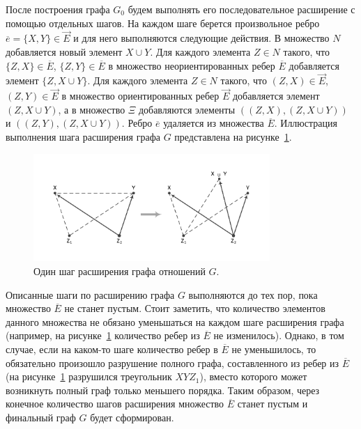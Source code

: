 \documentclass[
11pt,%
tightenlines,%
twoside,%
onecolumn,%
nofloats,%
nobibnotes,%
nofootinbib,%
superscriptaddress,%
noshowpacs,%
centertags]%
{revtex4}
\begin{document}
После построения графа $G_0$ будем выполнять его последовательное расширение с помощью отдельных шагов.
На каждом шаге берется произвольное ребро $\overline{e} = \{X, Y\} \in \overrightarrow{E}$ и для него выполняются следующие действия.
В множество $N$ добавляется новый элемент $X \cup Y$.
Для каждого элемента $Z \in N$ такого, что $\{Z, X\} \in \overline{E}$, $\{Z, Y\} \in \overline{E}$ в множество неориентированных ребер $\overline{E}$ добавляется элемент $\{Z, X \cup Y\}$.
Для каждого элемента $Z \in N$ такого, что $(Z, X) \in \overrightarrow{E}$, $(Z, Y) \in \overrightarrow{E}$ в множество ориентированных ребер $\overrightarrow{E}$ добавляется элемент $(Z, X \cup Y)$, а в множество $\Xi$ добавляются элементы $((Z, X), (Z, X \cup Y))$ и $((Z, Y), (Z, X \cup Y))$.
Ребро $\overline{e}$ удаляется из множества $\overline{E}$.
Иллюстрация выполнения шага расширения графа $G$ представлена на рисунке~\ref{fig:step}.

\begin{figure}[h]
\setcaptionmargin{5mm}
\onelinecaptionsfalse %
\includegraphics[width=0.8\textwidth]{pics/step.pdf}
\caption{Один шаг расширения графа отношений $G$.}
\label{fig:step}
\end{figure}

Описанные шаги по расширению графа $G$ выполняются до тех пор, пока множество $\overline{E}$ не станет пустым.
Стоит заметить, что количество элементов данного множества не обязано уменьшаться на каждом шаге расширения графа (например, на рисунке~\ref{fig:step} количество ребер из $\overline{E}$ не изменилось).
Однако, в том случае, если на каком-то шаге количество ребер в $\overline{E}$ не уменьшилось, то обязательно произошло разрушение полного графа, составленного из ребер из $\overline{E}$ (на рисунке~\ref{fig:step} разрушился треугольник $XYZ_1$), вместо которого может возникнуть полный граф только меньшего порядка.
Таким образом, через конечное количество шагов расширения множество $\overline{E}$ станет пустым и финальный граф $G$ будет сформирован.
\end{document}
